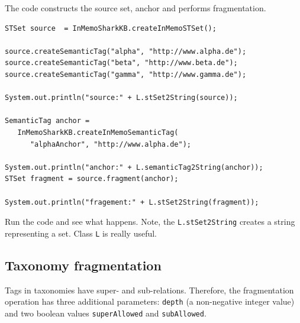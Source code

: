 The code constructs the source set, anchor and performs fragmentation.

\begin{verbatim}
STSet source  = InMemoSharkKB.createInMemoSTSet();

source.createSemanticTag("alpha", "http://www.alpha.de");
source.createSemanticTag("beta", "http://www.beta.de");
source.createSemanticTag("gamma", "http://www.gamma.de");

System.out.println("source:" + L.stSet2String(source));

SemanticTag anchor =
   InMemoSharkKB.createInMemoSemanticTag(
      "alphaAnchor", "http://www.alpha.de");

System.out.println("anchor:" + L.semanticTag2String(anchor));
STSet fragment = source.fragment(anchor);

System.out.println("fragement:" + L.stSet2String(fragment));
\end{verbatim}

Run the code and see what happens. Note, the {\tt L.stSet2String} creates a string representing a set. Class {\tt L} is really useful.

\subsection{Taxonomy fragmentation}
\label{sec:taxonomyFragmentation}
Tags in taxonomies have super- and sub-relations. Therefore, the fragmentation operation has three additional parameters: {\tt depth} (a non-negative integer value) and two boolean values {\tt superAllowed} and {\tt subAllowed}.

